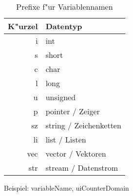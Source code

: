 \begin{table}
	\centering
		\begin{tabular}{r|l}\hline
			K"urzel & Datentyp\\\hline
			i & int\\
			s & short\\
			c & char\\
			l & long\\
			u & unsigned\\
			p & pointer / Zeiger\\
			sz  & string / Zeichenketten\\
			li  & list / Listen\\
			vec & vector / Vektoren\\
			str & stream / Datenstrom\\
		\end{tabular}
\caption{Prefixe f"ur Variablennamen}
\label{tabDatatypsPrefixe}
\end{table}

\noindent
Beispiel: variableName, uiCounterDomain






